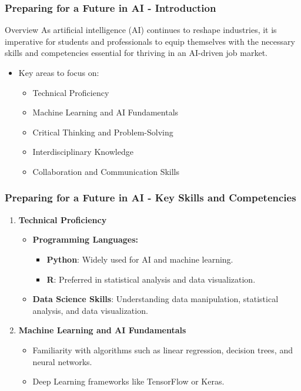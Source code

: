 \documentclass{beamer}
\begin{document}
\begin{frame}[fragile]
    \frametitle{Preparing for a Future in AI - Introduction}
    \begin{block}{Overview}
        As artificial intelligence (AI) continues to reshape industries, it is imperative for students and professionals to equip themselves with the necessary skills and competencies essential for thriving in an AI-driven job market.
    \end{block}
    \begin{itemize}
        \item Key areas to focus on:
        \begin{itemize}
            \item Technical Proficiency
            \item Machine Learning and AI Fundamentals
            \item Critical Thinking and Problem-Solving
            \item Interdisciplinary Knowledge
            \item Collaboration and Communication Skills
        \end{itemize}
    \end{itemize}
\end{frame}

\begin{frame}[fragile]
    \frametitle{Preparing for a Future in AI - Key Skills and Competencies}
    \begin{enumerate}
        \item \textbf{Technical Proficiency}
        \begin{itemize}
            \item \textbf{Programming Languages:}
            \begin{itemize}
                \item \textbf{Python}: Widely used for AI and machine learning.
                \item \textbf{R}: Preferred in statistical analysis and data visualization.
            \end{itemize}
            \item \textbf{Data Science Skills}: Understanding data manipulation, statistical analysis, and data visualization.
        \end{itemize}

        \item \textbf{Machine Learning and AI Fundamentals}
        \begin{itemize}
            \item Familiarity with algorithms such as linear regression, decision trees, and neural networks.
            \item Deep Learning frameworks like TensorFlow or Keras.
        \end{itemize}
    \end{enumerate}
\end{frame}
\end{document}
